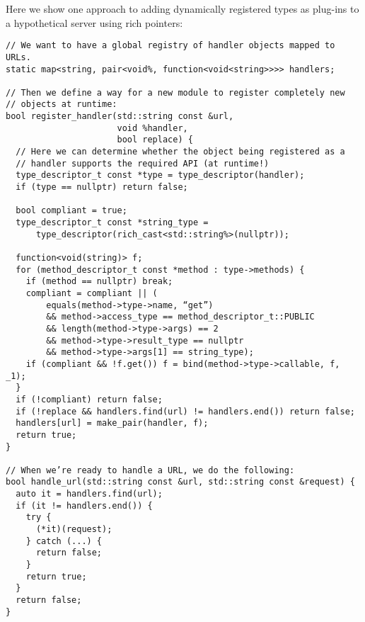 \documentclass[10pt,a4paper]{article}
\begin{document}
Here we show one approach to adding dynamically registered types as plug-ins to
a hypothetical server using rich pointers:

\begin{verbatim}
// We want to have a global registry of handler objects mapped to URLs.
static map<string, pair<void%, function<void<string>>>> handlers;

// Then we define a way for a new module to register completely new
// objects at runtime:
bool register_handler(std::string const &url,
                      void %handler,
                      bool replace) {
  // Here we can determine whether the object being registered as a
  // handler supports the required API (at runtime!)
  type_descriptor_t const *type = type_descriptor(handler);
  if (type == nullptr) return false;

  bool compliant = true;
  type_descriptor_t const *string_type =
      type_descriptor(rich_cast<std::string%>(nullptr));

  function<void(string)> f;
  for (method_descriptor_t const *method : type->methods) {
    if (method == nullptr) break;
    compliant = compliant || (
        equals(method->type->name, “get”)
        && method->access_type == method_descriptor_t::PUBLIC
        && length(method->type->args) == 2
        && method->type->result_type == nullptr
        && method->type->args[1] == string_type);
    if (compliant && !f.get()) f = bind(method->type->callable, f, _1);
  }
  if (!compliant) return false;
  if (!replace && handlers.find(url) != handlers.end()) return false;
  handlers[url] = make_pair(handler, f);
  return true;
}

// When we’re ready to handle a URL, we do the following:
bool handle_url(std::string const &url, std::string const &request) {
  auto it = handlers.find(url);
  if (it != handlers.end()) {
    try {
      (*it)(request);
    } catch (...) {
      return false;
    }
    return true;
  }
  return false;
}
\end{verbatim}
\end{document}
